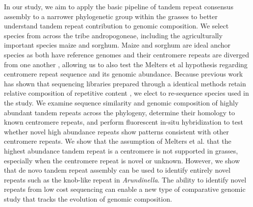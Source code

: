 \documentclass[10pt,letterpaper]{article}
\newcommand{\jri}[1]{\todo[size=\scriptsize, color=SkyBlue]{#1}}
\newcommand{\pb}[1]{\todo[size=\scriptsize, color=Bittersweet]{#1}} %
\begin{document}
In our study, we aim to apply the basic pipeline of tandem repeat consensus assembly to a narrower phylogenetic group within the grasses to better understand tandem repeat contribution to genomic composition.
We select species from across the tribe andropogoneae, including the agriculturally important species maize and sorghum.
Maize and sorghum are ideal anchor species as both have reference genomes and their centromere repeats are diverged from one another \cite{paterson2009sorghum,Schnable2009}, allowing us to also test the Melters et al \cite{melters2013comparative} hypothesis regarding centromere repeat sequence and its genomic abundance.
Because previous work has shown that sequencing libraries prepared through a identical methods retain relative composition of repetitive content \cite{bilinski2014diversity},%
 we elect to re-sequence species used in the study.
We examine sequence similarity and genomic composition of highly abundant tandem repeats across the phylogeny, determine their homology to known centromere repeats, and perform fluorescent in-situ hybridization to test whether novel high abundance repeats show patterns consistent with other centromere repeats.
We show that the assumption of Melters et al. \cite{melters2013comparative} that the highest abundance tandem repeat is a centromere is not supported in grasses, especially when the centromere repeat is novel or unknown.
However, we show that de novo tandem repeat assembly can be used to identify entirely novel repeats such as the knob-like repeat in \emph{Arundinella}.
The ability to identify novel repeats from low cost sequencing can enable a new type of comparative genomic study that tracks the evolution of genomic composition.%


\end{document}
